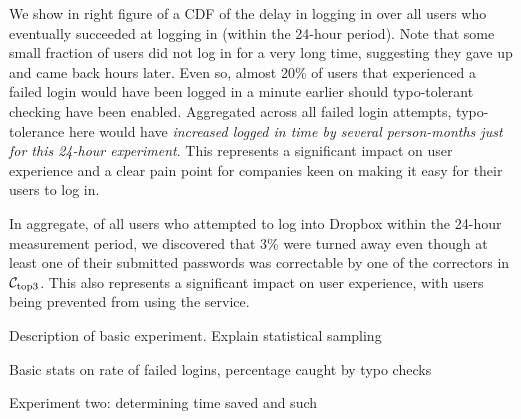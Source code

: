 We show in right figure of  a CDF of
the delay in logging in over all users who eventually succeeded at
logging in (within the 24-hour period).  Note that some small fraction
of users did not log in for a very long time, suggesting they gave up
and came back hours later. Even so, almost 20\% of users that
experienced a failed login would have been logged in a minute earlier
should typo-tolerant checking have been enabled. Aggregated across all
failed login attempts, typo-tolerance here would have \emph{increased
  logged in time by several person-months just for this 24-hour
  experiment}.
This represents a significant impact on
user experience and a clear pain point for companies keen on making it easy
for their users to log in.


In aggregate, of all users who attempted to log
into Dropbox within the 24-hour measurement period, we discovered that 3\% were turned
away even though at least one of their submitted passwords was
correctable by one of the correctors in ${\mathcal C}_{\textrm{top3}}$. %
This
also represents a significant impact on user experience, with users being
prevented from using the service.



\iffalse
\bigskip
\bigskip



\begin{newenum}
\item Description of basic experiment.  Explain
statistical sampling
\item Basic stats on rate of failed logins, percentage caught by typo checks
\item Experiment two: determining time saved and such
\end{newenum}

